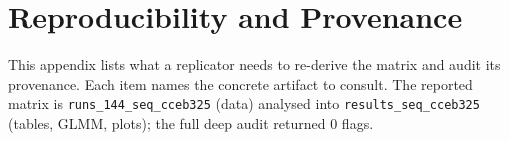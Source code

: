 

\section{Reproducibility and Provenance}
\label{sec:reproducibility}

This appendix lists what a replicator needs to re-derive the matrix and audit its provenance.
Each item names the concrete artifact to consult. The reported matrix is
\texttt{runs\_144\_seq\_cceb325} (data) analysed into \texttt{results\_seq\_cceb325}
(tables, GLMM, plots); the full deep audit returned $0$ flags.

